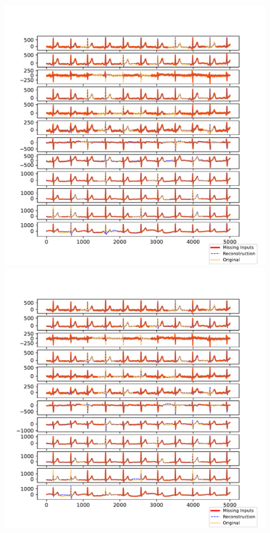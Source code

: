 \documentclass{mldsmsc}
\begin{document}

\begin{figure}[H]
\centering
\begin{minipage}{0.4\linewidth}
    \centering
    \includegraphics[width=\linewidth]{images/missing/psmf_output_20_3.pdf}
\end{minipage}%
\hspace{0.05\linewidth}
\begin{minipage}{0.4\linewidth}
    \centering
    \includegraphics[width=\linewidth]{images/missing/rpsmf_output_20_3.pdf}

\end{minipage}
\end{figure}
\end{document}
